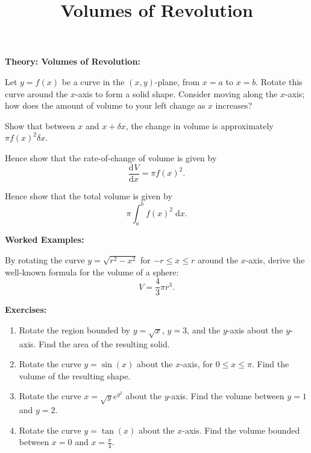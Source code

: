 \documentclass{article}
\newcommand{\deriv}[3][]{\frac{\mathrm{d}^{#1}#2}{\mathrm{d}#3^{#1}}}
\newcommand{\diff}{\;\mathrm{d}}
\begin{document}
\title{Volumes of Revolution}
\date{}

\maketitle
\thispagestyle{empty}

\Large






\textbf{Theory: Volumes of Revolution:}\bigskip


Let $y=f(x)$ be a curve in the $(x,y)$-plane, from $x=a$ to $x=b$. Rotate this curve around the $x$-axis to form a solid shape. Consider moving along the $x$-axis; how does the amount of volume to your left change as $x$ increases?

Show that between $x$ and $x+\delta x$, the change in volume is approximately $\pi f(x)^2 \delta x$.\vfill


Hence show that the rate-of-change of volume is given by
\[\deriv{V}{x}=\pi f(x)^2.\]\vfill


Hence show that the total volume is given by
\[\pi\int_a^b f(x)^2\diff x.\]





\clearpage


\textbf{Worked Examples:}\bigskip

By rotating the curve $y=\sqrt{r^2-x^2}$ for $-r\leq x\leq r$ around the $x$-axis, derive the well-known formula for the volume of a sphere:
\[V=\frac{4}{3}\pi r^3.\]




\clearpage


{\bf Exercises:}

\vspace{5mm}

\begin{enumerate}
	\item Rotate the region bounded by $y=\sqrt{x}$, $y=3$, and the $y$-axis about the $y$-axis. Find the area of the resulting solid.
	\item Rotate the curve $y=\sin(x)$ about the $x$-axis, for $0\leq x \leq \pi$. Find the volume of the resulting shape.
	\item Rotate the curve $x=\sqrt{y}e^{y^2}$ about the $y$-axis. Find the volume between $y=1$ and $y=2$.
	\item Rotate the curve $y=\tan(x)$ about the $x$-axis. Find the volume bounded between $x=0$ and $x=\frac{\pi}{4}$.
\end{enumerate}
\end{document}
